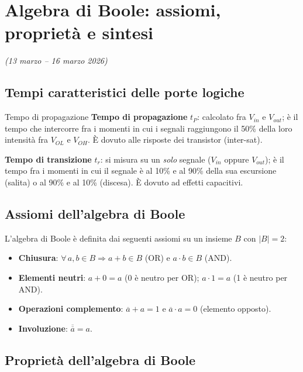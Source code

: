 \chapter{Algebra di Boole: assiomi, proprietà e sintesi}
\label{ch:boole-sintesi}
\textit{(13 marzo -- 16 marzo 2026)}

\section{Tempi caratteristici delle porte logiche}

\begin{definizione}{Tempo di propagazione}
\textbf{Tempo di propagazione} $t_P$: calcolato fra $V_{in}$ e $V_{out}$; è il tempo che intercorre fra i momenti in cui i segnali raggiungono il 50\% della loro intensità fra $V_{OL}$ e $V_{OH}$. È dovuto alle risposte dei transistor (inter-sat).

\medskip
\textbf{Tempo di transizione} $t_r$: si misura su un \emph{solo} segnale ($V_{in}$ oppure $V_{out}$); è il tempo fra i momenti in cui il segnale è al 10\% e al 90\% della sua escursione (salita) o al 90\% e al 10\% (discesa). È dovuto ad effetti capacitivi.
\end{definizione}

\section{Assiomi dell'algebra di Boole}

L'algebra di Boole è definita dai seguenti assiomi su un insieme $B$ con $|B|=2$:

\begin{itemize}[leftmargin=1.5em]
    \item \textbf{Chiusura}: $\forall\,a,b\in B \Rightarrow a+b\in B$ (OR) e $a\cdot b\in B$ (AND).
    \item \textbf{Elementi neutri}: $a+0=a$ \quad (0 è neutro per OR); \quad $a\cdot 1=a$ \quad (1 è neutro per AND).
    \item \textbf{Operazioni complemento}: $\overline{a}+a=1$ \quad e \quad $\overline{a}\cdot a=0$ \quad (elemento opposto).
    \item \textbf{Involuzione}: $\overline{\overline{a}}=a$.
\end{itemize}

\section{Proprietà dell'algebra di Boole}

